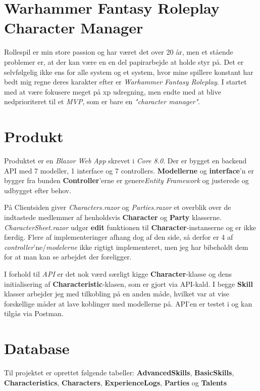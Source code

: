\documentclass{article}
\begin{document}
\section*{Warhammer Fantasy Roleplay Character Manager}
Rollespil er min store passion og har været det over 20 år, men et stående problemer er, at der kan være en en del papirarbejde at holde styr på.\newline{}
Det er selvfølgelig ikke ens for alle system og et system, hvor mine spillere konstant har bedt mig regne deres karakter efter er \textit{Warhammer Fantasy Roleplay}. I startet med at være fokusere meget på xp udregning, men endte med at blive nedprioriteret til et \textit{MVP}, som er bare en \textit{"character manager"}.

\section*{Produkt}
Produktet er en \textit{Blazor Web App} skrevet i \textit{Core 8.0}.\newline{}
Der er bygget en backend API med 7 modeller, 1 interface og 7 controllers.\newline{}
\textbf{Modellerne} og \textbf{interface}'n er bygger fra bunden\newline{}
\textbf{Controller}'erne er genere\textit{Entity Framework} og justerede og udbygget efter behov.\par{}

På Clientsiden giver \textit{Characters.razor} og \textit{Parties.razor} et overblik over de indtastede medlemmer af henholdsvis \textbf{Character} og \textbf{Party} klasserne.\newline{}
\textit{CharacterSheet.razor} udgør \textbf{edit} funktionen til \textbf{Character}-instanserne og er ikke færdig. Flere af implementeringer afhang dog af den side, så derfor er 4 af \textit{controller}'ne/\textit{modelerne} ikke rigtigt implementeret, men jeg har bibeholdt dem for at man kan se arbejdet der foreligger.\par{}

I forhold til \textit{API} er det nok værd særligt kigge \textbf{Character}-klasse og dens initialisering af \textbf{Characteristic}-klasen, som er gjort via API-kald. I begge \textbf{Skill} klasser arbejder jeg med tilkobling på en anden måde, hvilket var at vise forskellige måder at lave koblinger med modellerne på.\newline{}
API'en er testet i og kan tilgås via Postman.

\section*{Database}
Til projektet er oprettet følgende tabeller:
\textbf{AdvancedSkills}, \textbf{BasicSkills}, \textbf{Characteristics}, \textbf{Characters}, \textbf{ExperienceLogs}, \textbf{Parties} og \textbf{Talents}
\end{document}
